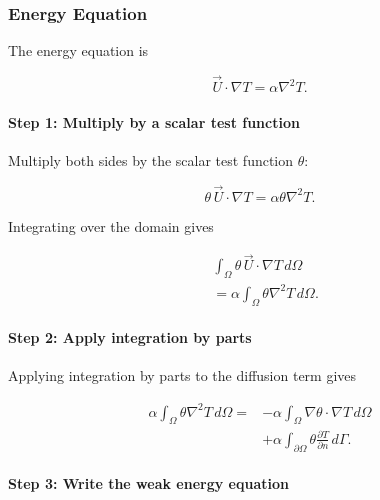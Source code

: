 \documentclass[preprint,3p,number]{elsarticle}
\begin{document}
\subsubsection{Energy Equation}

The energy equation is

\begin{equation}
\vec{U}\cdot\nabla T
=\alpha\nabla^2T.
\end{equation}

\paragraph{Step 1: Multiply by a scalar test function}

Multiply both sides by the scalar test function $\theta$:

\begin{equation}
\theta\,\vec{U}\cdot\nabla T
=\alpha\theta\nabla^2T.
\end{equation}

Integrating over the domain gives

\begin{equation}
\begin{aligned}
&\int_\Omega \theta\,\vec{U}\cdot\nabla T\,d\Omega\\
&=\alpha\int_\Omega \theta\nabla^2T\,d\Omega.
\end{aligned}
\end{equation}

\paragraph{Step 2: Apply integration by parts}

Applying integration by parts to the diffusion term gives

\begin{equation}
\begin{aligned}
\alpha\int_\Omega \theta\nabla^2T\,d\Omega
={}&-\alpha\int_\Omega
\nabla\theta\cdot\nabla T\,d\Omega\\
&+\alpha\int_{\partial\Omega}
\theta\frac{\partial T}{\partial n}\,d\Gamma.
\end{aligned}
\end{equation}

\paragraph{Step 3: Write the weak energy equation}
\end{document}

